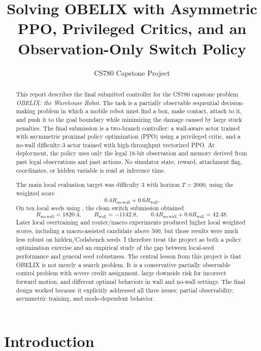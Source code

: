 \documentclass[11pt]{article}
\title{\textbf{Solving OBELIX with Asymmetric PPO, Privileged Critics, and an Observation-Only Switch Policy}}
\author{CS780 Capstone Project}
\date{}
\begin{document}
\maketitle

\begin{abstract}
This report describes the final submitted controller for the CS780 capstone problem
\emph{OBELIX: the Warehouse Robot}. The task is a partially observable sequential
decision-making problem in which a mobile robot must find a box, make contact,
attach to it, and push it to the goal boundary while minimizing the damage caused by
large stuck penalties. The final submission is a two-branch controller: a wall-aware
actor trained with asymmetric proximal policy optimization (PPO) using a privileged
critic, and a no-wall difficulty-3 actor trained with high-throughput vectorized PPO.
At deployment, the policy uses only the legal 18-bit observation and memory derived
from past legal observations and past actions. No simulator state, reward, attachment
flag, coordinates, or hidden variable is read at inference time.

The main local evaluation target was difficulty 3 with horizon \(T=2000\), using the
weighted score
\[
  0.4 R_{\text{no-wall}} + 0.6 R_{\text{wall}}.
\]
On ten local seeds using , the clean switch submission obtained
\[
  R_{\text{no-wall}} = 1820.4,
  \qquad
  R_{\text{wall}} = -1142.8,
  \qquad
  0.4R_{\text{no-wall}} + 0.6R_{\text{wall}} = 42.48.
\]
Later local overtraining and router/macro experiments produced higher local weighted
scores, including a macro-assisted candidate above \(500\), but those results were much
less robust on hidden/Codabench seeds. I therefore treat the project as both a policy
optimization exercise and an empirical study of the gap between local-seed performance
and general seed robustness.
The central lesson from this project is that OBELIX is not merely a search problem. It
is a conservative partially observable control problem with severe credit assignment,
large downside risk for incorrect forward motion, and different optimal behaviors in
wall and no-wall settings. The final design worked because it explicitly addressed all
three issues: partial observability, asymmetric training, and mode-dependent behavior.
\end{abstract}

\section{Introduction}
\end{document}

